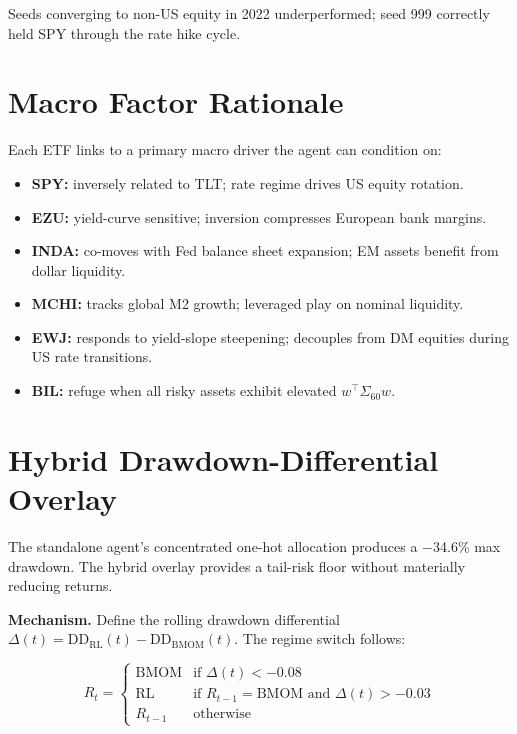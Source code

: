 \documentclass[11pt, a4paper]{article}
\begin{document}
Seeds converging to non-US equity in 2022 underperformed; seed 999 correctly held SPY through the rate hike cycle.

\section{Macro Factor Rationale}

Each ETF links to a primary macro driver the agent can condition on:

\begin{itemize}[leftmargin=*, itemsep=0.2em]
  \item \textbf{SPY:} inversely related to TLT; rate regime drives US equity rotation.
  \item \textbf{EZU:} yield-curve sensitive; inversion compresses European bank margins.
  \item \textbf{INDA:} co-moves with Fed balance sheet expansion; EM assets benefit from dollar liquidity.
  \item \textbf{MCHI:} tracks global M2 growth; leveraged play on nominal liquidity.
  \item \textbf{EWJ:} responds to yield-slope steepening; decouples from DM equities during US rate transitions.
  \item \textbf{BIL:} refuge when all risky assets exhibit elevated $w^\top \Sigma_{60} w$.
\end{itemize}

\section{Hybrid Drawdown-Differential Overlay}

The standalone agent's concentrated one-hot allocation produces a $-$34.6\% max drawdown. The hybrid overlay provides a tail-risk floor without materially reducing returns.

\textbf{Mechanism.} Define the rolling drawdown differential $\Delta(t) = \text{DD}_{\text{RL}}(t) - \text{DD}_{\text{BMOM}}(t)$. The regime switch follows:

\[
R_t = \begin{cases}
  \text{BMOM} & \text{if } \Delta(t) < -0.08 \\
  \text{RL}   & \text{if } R_{t-1} = \text{BMOM} \text{ and } \Delta(t) > -0.03 \\
  R_{t-1}     & \text{otherwise}
\end{cases}
\]
\end{document}
